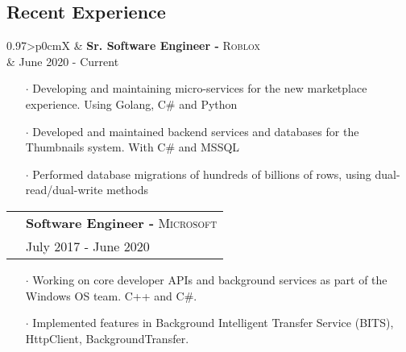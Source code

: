 \documentclass[letterpaper, oneside, final]{scrartcl} %
\newcommand{\gray}{\rowcolor[gray]{.90}} %
\begin{document}
\begin{center}
\vspace{-3mm}

\section{Recent Experience}

\renewcommand{\arraystretch}{1.3}

\begin{tabularx}{0.97\linewidth}{>{\raggedleft\scshape}p{0cm}X}
\gray & \textbf{Sr. Software Engineer -} \textsc{Roblox}\\
\gray & {June 2020  - Current}\\
\end{tabularx}
\vspace{-0.1cm}
\begin{itemize} \itemsep-0.2cm
\item[$\cdot$]  Developing and maintaining micro-services for the new marketplace experience. Using Golang, C\# and Python
\item[$\cdot$]  Developed and maintained backend services and databases for the Thumbnails system. With C\# and MSSQL
\item[$\cdot$]  Performed database migrations of hundreds of billions of rows, using dual-read/dual-write methods

\end{itemize}

\vspace{-0.1cm}

\begin{tabularx}{0.97\linewidth}{>{\raggedleft\scshape}p{0cm}X}
\gray & \textbf{Software Engineer -} \textsc{Microsoft}\\
\gray & {July 2017 - June 2020}\\
\end{tabularx}
\vspace{-0.1cm}
\begin{itemize} \itemsep-0.2cm
\item[$\cdot$]  Working on core developer APIs and background services as part of the Windows OS team. C++ and C\#.
\item[$\cdot$]  Implemented features in Background Intelligent Transfer Service (BITS), HttpClient, BackgroundTransfer.
\end{itemize}

\vspace{-0.1cm}


\end{center}
\end{document}
